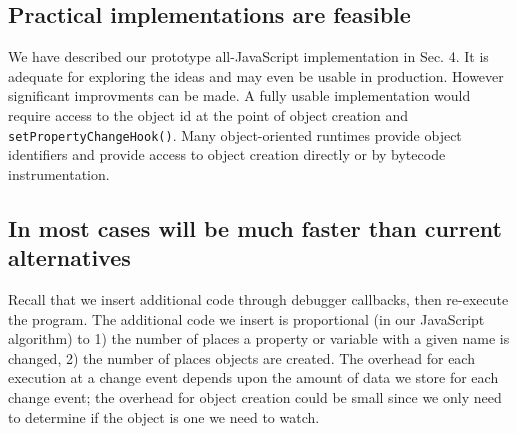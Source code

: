 \documentclass{sig-alternate}
\begin{document}


\subsection{Practical implementations are feasible}

We have described our prototype all-JavaScript implementation in Sec. 4. It is adequate for 
exploring the ideas and may even be usable in production. However significant 
improvments can be made. A fully usable
implementation would require access to the object id at the point of
object creation and \texttt{setPropertyChangeHook()}. Many
object-oriented runtimes provide object identifiers and 
provide access to object creation directly or by bytecode instrumentation\cite{JPDA}. 

\subsection{In most cases  will be much faster than current alternatives}


Recall that we
insert additional code through debugger callbacks, then re-execute the
program. The additional code we insert is proportional (in our
JavaScript algorithm) to 1) the number of places a property or
variable with a given name is changed, 2) the number of places objects
are created. The overhead for each execution at a change event
 depends upon the amount of data we store for each change event; 
the overhead for object creation could be small since we only need to 
determine if the object is one we need to watch.  
\end{document}
